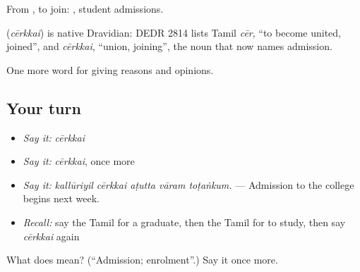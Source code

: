 From , to join:  , student admissions.

\begin{cousinweb}
\textbf{} (\emph{cērkkai}) is native Dravidian: DEDR 2814 lists Tamil \emph{cēr}, \textquotedblleft{}to become united, joined\textquotedblright{}, and \emph{cērkkai}, \textquotedblleft{}union, joining\textquotedblright{}, the noun that now names admission.
\end{cousinweb}

\begin{grammarlens}[title={What you've built}]
One more word for giving reasons and opinions.
\end{grammarlens}

\subsection*{Your turn}
\begin{itemize}
\raggedright
  \item \emph{Say it:} \emph{cērkkai}
  \item \emph{Say it:} \emph{cērkkai}, once more
  \item \emph{Say it:} \emph{kallūriyil cērkkai aṭutta vāram toṭaṅkum.} — Admission to the college begins next week.
  \item \emph{Recall:} say the Tamil for a graduate, then the Tamil for to study, then say \emph{cērkkai} again
\end{itemize}

\begin{tcolorbox}[breakable,colback=teal!4,colframe=teal!35!black,title={Before you move on}]
What does  mean? (\textquotedblleft{}Admission; enrolment\textquotedblright{}.) Say it once more.
\end{tcolorbox}
